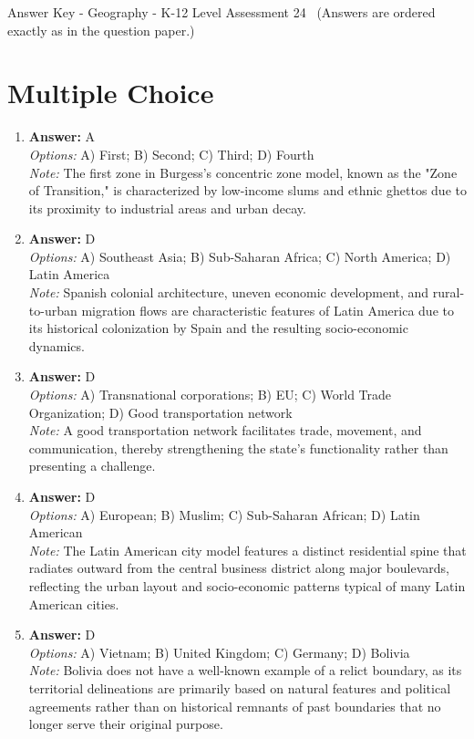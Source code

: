 \documentclass[12pt]{article}
\begin{document}
\begin{center}
Answer Key - Geography - K-12 Level Assessment 24 \
\small (Answers are ordered exactly as in the question paper.)
\end{center}

\section*{Multiple Choice}
\begin{enumerate}[label=\arabic*.]
\item \textbf{Answer:} A
\\ \textit{Options:} A) First; B) Second; C) Third; D) Fourth
\\ \textit{Note:} The first zone in Burgess's concentric zone model, known as the "Zone of Transition," is characterized by low-income slums and ethnic ghettos due to its proximity to industrial areas and urban decay.
\item \textbf{Answer:} D
\\ \textit{Options:} A) Southeast Asia; B) Sub-Saharan Africa; C) North America; D) Latin America
\\ \textit{Note:} Spanish colonial architecture, uneven economic development, and rural-to-urban migration flows are characteristic features of Latin America due to its historical colonization by Spain and the resulting socio-economic dynamics.
\item \textbf{Answer:} D
\\ \textit{Options:} A) Transnational corporations; B) EU; C) World Trade Organization; D) Good transportation network
\\ \textit{Note:} A good transportation network facilitates trade, movement, and communication, thereby strengthening the state's functionality rather than presenting a challenge.
\item \textbf{Answer:} D
\\ \textit{Options:} A) European; B) Muslim; C) Sub-Saharan African; D) Latin American
\\ \textit{Note:} The Latin American city model features a distinct residential spine that radiates outward from the central business district along major boulevards, reflecting the urban layout and socio-economic patterns typical of many Latin American cities.
\item \textbf{Answer:} D
\\ \textit{Options:} A) Vietnam; B) United Kingdom; C) Germany; D) Bolivia
\\ \textit{Note:} Bolivia does not have a well-known example of a relict boundary, as its territorial delineations are primarily based on natural features and political agreements rather than on historical remnants of past boundaries that no longer serve their original purpose.
\end{enumerate}
\end{document}
